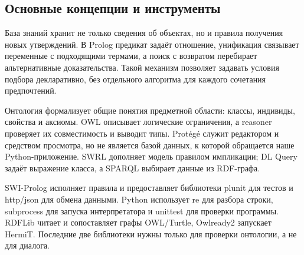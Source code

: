 \subsection{Основные концепции и инструменты}
База знаний хранит не только сведения об объектах, но и правила получения
новых утверждений. В Prolog предикат задаёт отношение, унификация связывает
переменные с подходящими термами, а поиск с возвратом перебирает альтернативные
доказательства. Такой механизм позволяет задавать условия подбора декларативно,
без отдельного алгоритма для каждого сочетания предпочтений.

Онтология формализует общие понятия предметной области: классы, индивиды,
свойства и аксиомы. OWL описывает логические ограничения, а reasoner проверяет
их совместимость и выводит типы. Protégé служит редактором и средством просмотра,
но не является базой данных, к которой обращается наше Python-приложение.
SWRL дополняет модель правилом импликации; DL Query задаёт выражение класса,
а SPARQL выбирает данные из RDF-графа.

SWI-Prolog исполняет правила и предоставляет библиотеки plunit для тестов
и http/json для обмена данными. Python использует re для разбора строки,
subprocess для запуска интерпретатора и unittest для проверки программы.
RDFLib читает и сопоставляет графы OWL/Turtle, Owlready2 запускает HermiT.
Последние две библиотеки нужны только для проверки онтологии, а не для диалога.
